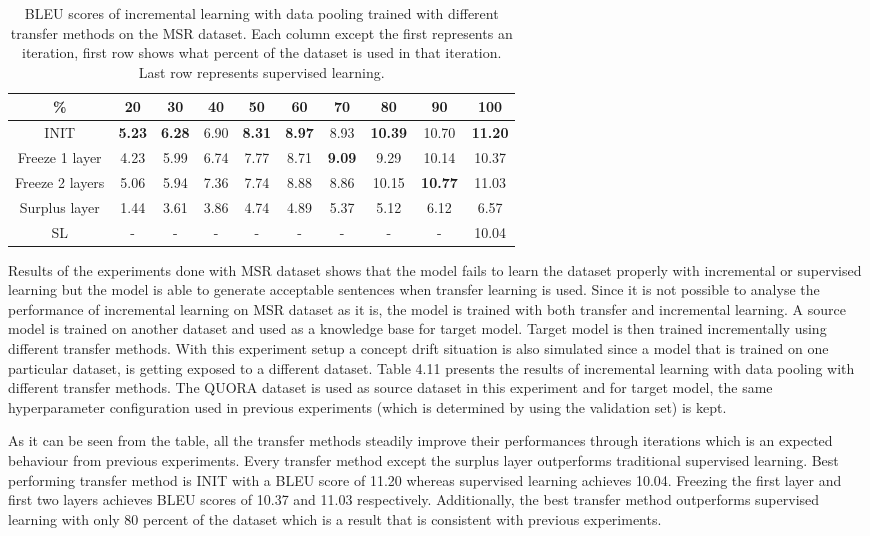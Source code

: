 \begin{table}[b]
\centering
\small
 \begin{tabular}{|c | c | c | c | c | c | c | c | c | c |} 
 \hline
 \% & 20 & 30 & 40 & 50 & 60 & 70 & 80 & 90 & 100 \\ [0.5ex] 
 \hline
  INIT & \textbf{5.23} & \textbf{6.28} & 6.90 & \textbf{8.31} & \textbf{8.97} & 8.93 & \textbf{10.39} & 10.70 & \textbf{11.20}  \\ 
 \hline
 Freeze 1 layer & 4.23 & 5.99 & 6.74 & 7.77 & 8.71 & \textbf{9.09} & 9.29 & 10.14 & 10.37 \\ 
 \hline
 Freeze 2 layers & 5.06 & 5.94 & 7.36 & 7.74 & 8.88 & 8.86 & 10.15 & \textbf{10.77} & 11.03 \\ 
  \hline
  Surplus layer & 1.44 & 3.61 & 3.86 & 4.74 & 4.89 & 5.37 & 5.12 & 6.12 & 6.57 \\ 
  \hline
  SL & - & - & - & - & - & - & - & - & 10.04 \\ 
 \hline
\end{tabular}
\caption{BLEU scores of incremental learning with data pooling trained with different transfer methods on the MSR dataset. Each column except the first represents an iteration, first row shows what percent of the dataset is used in that iteration. Last row represents supervised learning.}
\end{table}

Results of the experiments done with MSR dataset shows that the model fails to learn the dataset properly with incremental or supervised learning but the model is able to generate acceptable sentences when transfer learning is used. Since it is not possible to analyse the performance of incremental learning on MSR dataset as it is, the model is trained with both transfer and incremental learning. A source model is trained on another dataset and used as a knowledge base for target model. Target model is then trained incrementally using different transfer methods. With this experiment setup a concept drift situation is also simulated since a model that is trained on one particular dataset, is getting exposed to a different dataset. Table 4.11 presents the results of incremental learning with data pooling with different transfer methods. The QUORA dataset is used as source dataset in this experiment and for target model, the same hyperparameter configuration used in previous experiments (which is determined by using the validation set) is kept.

As it can be seen from the table, all the transfer methods steadily improve their performances through iterations which is an expected behaviour from previous experiments. Every transfer method except the surplus layer outperforms traditional supervised learning. Best performing transfer method is INIT with a BLEU score of 11.20 whereas supervised learning achieves 10.04. Freezing the first layer and first two layers achieves BLEU scores of 10.37 and 11.03 respectively. Additionally, the best transfer method outperforms supervised learning with only 80 percent of the dataset which is a result that is consistent with previous experiments.

